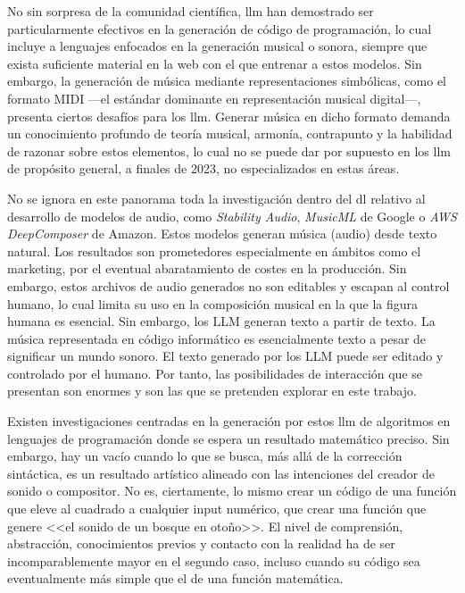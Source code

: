No sin sorpresa de la comunidad científica, \gls{llm} han demostrado ser particularmente efectivos en la generación de código de programación, lo cual incluye a lenguajes enfocados en la generación musical o sonora, siempre que exista suficiente material en la web con el que entrenar a estos modelos. Sin embargo, la generación de música mediante representaciones simbólicas, como el formato MIDI —el estándar dominante en representación musical digital—, presenta ciertos desafíos para los \gls{llm}. Generar música en dicho formato demanda un conocimiento profundo de teoría musical, armonía, contrapunto y la habilidad de razonar sobre estos elementos, lo cual no se puede dar por supuesto en los \gls{llm} de propósito general, a finales de 2023, no especializados en estas áreas.

No se ignora en este panorama toda la investigación dentro del \gls{dl} relativo al desarrollo de modelos de audio, como \textit{Stability Audio}, \textit{MusicML} de Google o \textit{AWS DeepComposer} de Amazon. Estos modelos generan música (audio) desde texto natural. Los resultados son prometedores especialmente en ámbitos como el marketing, por el eventual abaratamiento de costes en la producción. Sin embargo, estos archivos de audio generados no son editables y escapan al control humano, lo cual limita su uso en la composición musical en la que la figura humana es esencial. Sin embargo, los LLM generan texto a partir de texto. La música representada en código informático es esencialmente texto a pesar de significar un mundo sonoro. El texto generado por los LLM puede ser editado y controlado por el humano. Por tanto, las posibilidades de interacción que se presentan son enormes y son las que se pretenden explorar en este trabajo.

Existen investigaciones centradas en la generación por estos \gls{llm} de algoritmos en lenguajes de programación donde se espera un resultado matemático preciso. Sin embargo, hay un vacío cuando lo que se busca, más allá de la corrección sintáctica, es un resultado artístico alineado con las intenciones del creador de sonido o compositor. No es, ciertamente, lo mismo crear un código de una función que eleve al cuadrado a cualquier input numérico, que crear una función que genere <<el sonido de un bosque en otoño>>. El nivel de comprensión, abstracción, conocimientos previos y contacto con la realidad ha de ser incomparablemente mayor en el segundo caso, incluso cuando su código sea eventualmente más simple que el de una función matemática.

